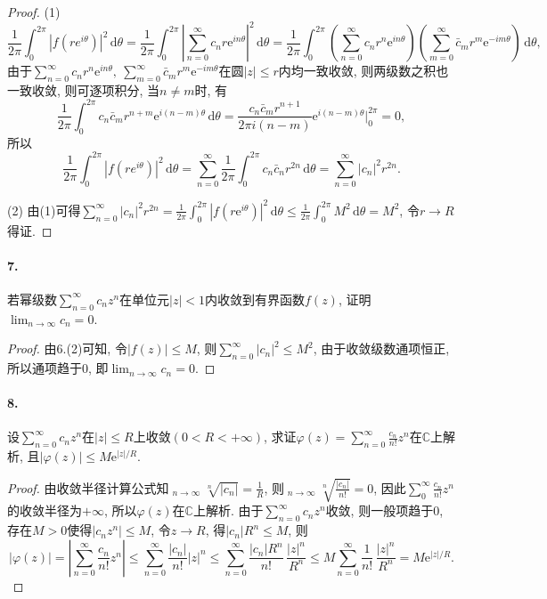 \documentclass[12pt, a4paper, oneside]{ctexart}
\DeclareMathOperator*\uplim{\overline{lim}} %
\def\C{\mathbb{C}}      %
\def\d{\mathrm{d}}      %
\def\e{\mathrm{e}}      %
\def\del{\vspace{-3.5ex}}  %
\begin{document}
\begin{proof}
    (1) 
    \begin{equation*}
        \frac{1}{2\pi}\int_0^{2\pi}|f(re^{i\theta})|^2\,\d\theta = \frac{1}{2\pi}\int_0^{2\pi}\left|\sum_{n=0}^{\infty}c_nr\e^{in\theta}\right|^2\,\d\theta = \frac{1}{2\pi}\int_0^{2\pi}\left(\sum_{n=0}^{\infty}c_nr^n\e^{in\theta}\right)\left(\sum_{m=0}^{\infty}\bar{c}_mr^m\e^{-im\theta}\right)\,\d\theta,
    \end{equation*}
    由于$ \sum_{n=0}^\infty c_nr^n\e^{in\theta},\ \sum_{m=0}^\infty \bar{c}_mr^m\e^{-im\theta}$在圆$|z|\leqslant r$内均一致收敛, 则两级数之积也一致收敛, 则可逐项积分, 当$n\neq m$时, 有
    \begin{equation*}
        \frac{1}{2\pi}\int_0^{2\pi}c_n\bar{c}_mr^{n+m}\e^{i(n-m)\theta}\,\d\theta = \frac{c_n\bar{c}_mr^{n+1}}{2\pi i(n-m)}\e^{i(n-m)\theta}\biggl|_0^{2\pi} = 0,
    \end{equation*}
    所以
    \begin{equation*}
        \frac{1}{2\pi}\int_0^{2\pi}|f(re^{i\theta})|^2\,\d\theta = \sum_{n=0}^{\infty}\frac{1}{2\pi}\int_0^{2\pi}c_n\bar{c}_nr^{2n}\,\d\theta = \sum_{n=0}^\infty|c_n|^2r^{2n}.
    \end{equation*}

    (2) 由(1)可得$ \sum_{n=0}^\infty|c_n|^2r^{2n}=\frac{1}{2\pi}\int_0^{2\pi}|f(r\e^{i\theta})|^2\,\d\theta\leqslant \frac{1}{2\pi}\int_0^{2\pi}M^2\,\d\theta = M^2$, 令$r\to R$得证.
\end{proof}
\paragraph{7.}若幂级数$ \sum_{n=0}^\infty c_nz^n$在单位元$|z|<1$内收敛到有界函数$f(z)$, 证明$ \lim_{n\to\infty}c_n=0$.
\begin{proof}
    由6.(2)可知, 令$|f(z)|\leqslant M$, 则$\sum_{n=0}^\infty|c_n|^2\leqslant M^2$, 由于收敛级数通项恒正, 所以通项趋于$0$, 即$\lim_{n\to \infty}c_n=0$.
\end{proof}
\paragraph{8.}设$ \sum_{n=0}^\infty c_nz^n$在$|z|\leqslant R$上收敛$(0 < R < +\infty)$, 求证$\varphi(z) = \sum_{n=0}^\infty\frac{c_n}{n!}z^n$在$\C$上解析, 且$|\varphi(z)|\leqslant M\e^{|z|/R}$.
\begin{proof}
    由收敛半径计算公式知$\uplim_{n\to\infty}\sqrt[n]{|c_n|} = \frac{1}{R}$, 则$\uplim_{n\to\infty}\sqrt[n]{\frac{|c_n|}{n!}} = 0$, 因此$\sum_0^{\infty}\frac{c_n}{n!}z^n$的收敛半径为$+\infty$, 所以$\varphi(z)$在$\C$上解析. 由于$\sum_{n=0}^\infty c_nz^n$收敛, 则一般项趋于$0$, 存在$M > 0$使得$|c_nz^n|\leqslant M$, 令$z\to R$, 得$|c_n|R^n\leqslant M$, 则
    \begin{equation*}
        |\varphi(z)| = \left|\sum_{n=0}^\infty \frac{c_n}{n!}z^n\right|\leqslant \sum_{n=0}^\infty \frac{|c_n|}{n!}|z|^n\leqslant \sum_{n=0}^\infty \frac{|c_n|R^n}{n!}\,\frac{|z|^n}{R^n}\leqslant M\sum_{n=0}^\infty\frac{1}{n!}\,\frac{|z|^n}{R^n} = M\e^{|z|/R}.
    \end{equation*}
\end{proof}
\del
\end{document}
